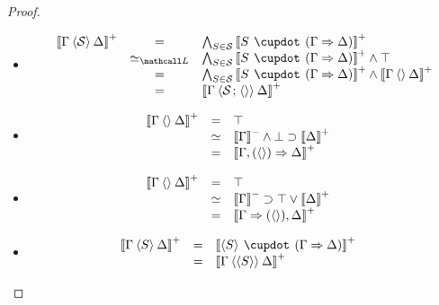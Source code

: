 \begin{proof}
\begin{itemize}
    \item[\rsf{p}]
    $$
    \begin{array}{rcll}
      \psint{\Gamma \piq{\cS} \Delta}
      &=& \psintAndMix{S}{\cS}{\Gamma}{\Delta} \\
      &\semequiv_{\Lattice}& \psintAndMix{S}{\cS}{\Gamma}{\Delta} \wedge \top \\
      &=& \psintAndMix{S}{\cS}{\Gamma}{\Delta} \wedge \psint{\Gamma \piq{} \Delta} \\
      &=& \psint{\Gamma \piq{\cS \sep \piq{}} \Delta} \\
    \end{array}
    $$

    \item[\rsf{p{-}}]
    $$
    \begin{array}{rcll}
      \left\llbracket \Gamma \mathbin{\langle  \rangle} \Delta \right\rrbracket^+
      &=& \top & \\
      &\simeq& \left\llbracket \Gamma \right\rrbracket^- \wedge \bot \supset \left\llbracket \Delta \right\rrbracket^+ & \\
      &=& \left\llbracket \Gamma, (\mathbin{\langle  \rangle}) \Rightarrow \Delta \right\rrbracket^+ & \\
    \end{array}
    $$

    \item[\rsf{p{+}}]
    $$
    \begin{array}{rcll}
      \left\llbracket \Gamma \mathbin{\langle  \rangle} \Delta \right\rrbracket^+
      &=& \top & \\
      &\simeq& \left\llbracket \Gamma \right\rrbracket^- \supset \top \lor \left\llbracket \Delta \right\rrbracket^+ & \\
      &=& \left\llbracket \Gamma \Rightarrow (\mathbin{\langle  \rangle}), \Delta \right\rrbracket^+ & \\
    \end{array}
    $$

    \item[\rsf{a}]
    $$
    \begin{array}{rcll}
      \psint{\Gamma \piq{S} \Delta}
      &=& \psint{\piq{S} \mix (\Gamma \seq \Delta)} & \\
      &=& \psint{\Gamma \piq{\piq{S}} \Delta} & \\
    \end{array}
    $$


\end{itemize}
\end{proof}
